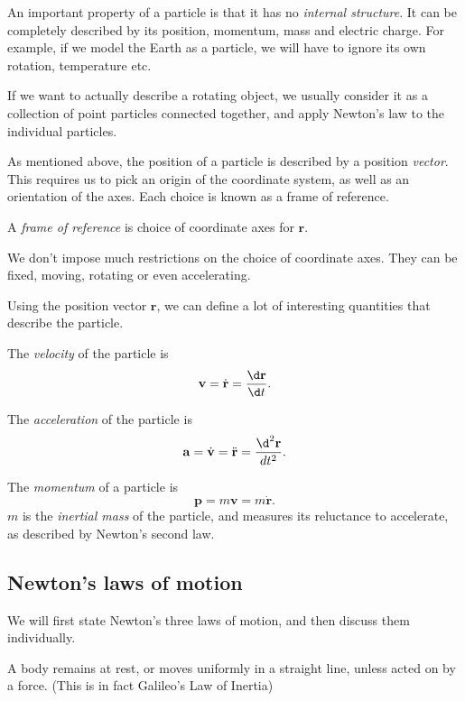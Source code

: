 \documentclass[a4paper]{article}
\begin{document}
An important property of a particle is that it has no \emph{internal structure}. It can be completely described by its position, momentum, mass and electric charge. For example, if we model the Earth as a particle, we will have to ignore its own rotation, temperature etc.

If we want to actually describe a rotating object, we usually consider it as a collection of point particles connected together, and apply Newton's law to the individual particles.

As mentioned above, the position of a particle is described by a position \emph{vector}. This requires us to pick an origin of the coordinate system, as well as an orientation of the axes. Each choice is known as a frame of reference.

\begin{defi}
  A \emph{frame of reference} is choice of coordinate axes for $\mathbf{r}$.
\end{defi}
We don't impose much restrictions on the choice of coordinate axes. They can be fixed, moving, rotating or even accelerating.

Using the position vector $\mathbf{r}$, we can define a lot of interesting quantities that describe the particle.
\begin{defi}[Velocity]
  The \emph{velocity} of the particle is
  \[
    \mathbf{v} = \dot{\mathbf{r}} = \frac{\d \mathbf{r}}{\d t}.
  \]
\end{defi}

\begin{defi}[Acceleration]
  The \emph{acceleration} of the particle is
  \[
    \mathbf{a} = \dot{\mathbf{v}} = \ddot{\mathbf{r}} = \frac{\d^2 \mathbf{r}}{d t^2}.
  \]
\end{defi}

\begin{defi}[Momentum]
  The \emph{momentum} of a particle is
  \[
    \mathbf{p} = m\mathbf{v} = m\dot{\mathbf{r}}.
  \]
  $m$ is the \emph{inertial mass} of the particle, and measures its reluctance to accelerate, as described by Newton's second law.
\end{defi}

\subsection{Newton's laws of motion}
We will first state Newton's three laws of motion, and then discuss them individually.
\begin{law}
  A body remains at rest, or moves uniformly in a straight line, unless acted on by a force. (This is in fact Galileo's Law of Inertia)
\end{law}
\end{document}
